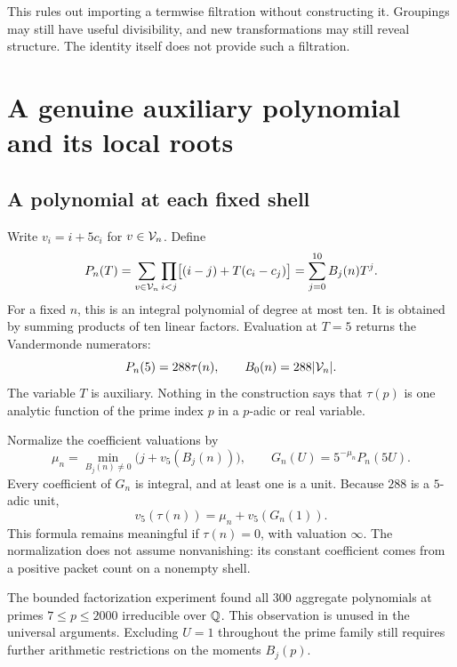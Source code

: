 This rules out importing a termwise filtration without constructing it. Groupings may still have useful divisibility, and new transformations may still reveal structure. The identity itself does not provide such a filtration.

\chapter{A genuine auxiliary polynomial and its local roots}\label{ch:auxiliary}
\section{A polynomial at each fixed shell}
Write $v_i=i+5c_i$ for $v\in\mathcal V_n$. Define
\begin{equation}\label{eq:pn}
P_n(T)=\sum_{v\in\mathcal V_n}\prod_{i<j}\bigl[(i-j)+T(c_i-c_j)\bigr]
=\sum_{j=0}^{10}B_j(n)T^j.
\end{equation}
For a fixed $n$, this is an integral polynomial of degree at most ten. It is obtained by summing products of ten linear factors. Evaluation at $T=5$ returns the Vandermonde numerators:
\begin{equation}\label{eq:pn5}
P_n(5)=288\tau(n),\qquad B_0(n)=288|\mathcal V_n|.
\end{equation}
The variable $T$ is auxiliary. Nothing in the construction says that $\tau(p)$ is one analytic function of the prime index $p$ in a $p$-adic or real variable.

Normalize the coefficient valuations by
\[
\mu_n=\min_{B_j(n)\ne0}\bigl(j+v_5(B_j(n))\bigr),\qquad
G_n(U)=5^{-\mu_n}P_n(5U).
\]
Every coefficient of $G_n$ is integral, and at least one is a unit. Because $288$ is a $5$-adic unit,
\begin{equation}\label{eq:gnvaluation}
v_5(\tau(n))=\mu_n+v_5(G_n(1)).
\end{equation}
This formula remains meaningful if $\tau(n)=0$, with valuation $\infty$. The normalization does not assume nonvanishing: its constant coefficient comes from a positive packet count on a nonempty shell.

The bounded factorization experiment found all $300$ aggregate polynomials at primes $7\le p\le2000$ irreducible over $\mathbb Q$. This observation is unused in the universal arguments. Excluding $U=1$ throughout the prime family still requires further arithmetic restrictions on the moments $B_j(p)$.

